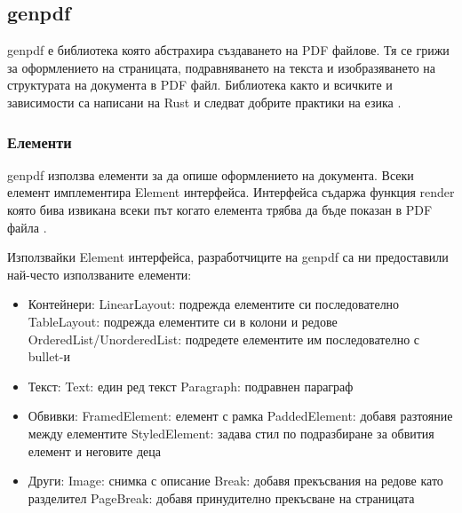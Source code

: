 \subsection{genpdf}
genpdf е библиотека която абстрахира създаването на PDF файлове. Тя се грижи за
оформлението на страницата, подравняването на текста и изобразяването на
структурата на документа в PDF файл. Библиотека както и всичките и зависимости
са написани на Rust и следват добрите практики на езика
\cite{genpdf_repository}.

\subsubsection{Елементи}
genpdf използва елементи за да опише оформлението на документа. Всеки елемент
имплементира Element интерфейса. Интерфейса съдаржа функция render която бива
извикана всеки път когато елемента трябва да бъде показан в PDF файла
\cite{genpdf_element_trait}.

Използвайки Element интерфейса, разработчиците на genpdf са ни предоставили
най-често използваните елементи:
\begin{itemize}
    \item Контейнери:
        \subitem LinearLayout: подрежда елементите си последователно
        \subitem TableLayout: подрежда елементите си в колони и редове
        \subitem OrderedList/UnorderedList: подредете елементите им последователно с bullet-и
    \item Текст:
        \subitem Text: един ред текст
        \subitem Paragraph: подравнен параграф
    \item Обвивки:
        \subitem FramedElement: елемент с рамка
        \subitem PaddedElement: добавя разтояние между елементите
        \subitem StyledElement: задава стил по подразбиране за обвития елемент и неговите деца
    \item Други:
        \subitem Image: снимка с описание
        \subitem Break: добавя прекъсвания на редове като разделител
        \subitem PageBreak: добавя принудително прекъсване на страницата
\end{itemize}
